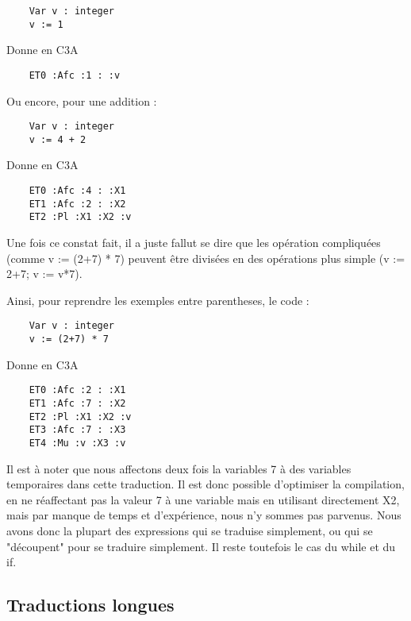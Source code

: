 \documentclass{article}
\begin{document}
\begin{lstlisting}
    Var v : integer
    v := 1
\end{lstlisting}

Donne en C3A

\begin{lstlisting}
    ET0 :Afc :1 : :v
\end{lstlisting}

Ou encore, pour une addition :

\begin{lstlisting}
    Var v : integer
    v := 4 + 2
\end{lstlisting}

Donne en C3A

\begin{lstlisting}
    ET0 :Afc :4 : :X1
    ET1 :Afc :2 : :X2
    ET2 :Pl :X1 :X2 :v
\end{lstlisting}

\bigbreak

Une fois ce constat fait, il a juste fallut se dire que les opération compliquées (comme v := (2+7) * 7) peuvent être divisées en des opérations plus simple (v := 2+7; v := v*7).

Ainsi, pour reprendre les exemples entre parentheses, le code :

\begin{lstlisting}
    Var v : integer
    v := (2+7) * 7
\end{lstlisting}

Donne en C3A

\begin{lstlisting}
    ET0 :Afc :2 : :X1
    ET1 :Afc :7 : :X2
    ET2 :Pl :X1 :X2 :v
    ET3 :Afc :7 : :X3
    ET4 :Mu :v :X3 :v
\end{lstlisting}

Il est à noter que nous affectons deux fois la variables 7 à des variables temporaires dans cette traduction. Il est donc possible d'optimiser la compilation, en ne réaffectant pas la valeur 7 à une variable mais en utilisant directement X2, mais par manque de temps et d'expérience, nous n'y sommes pas parvenus.
\bigbreak
Nous avons donc la plupart des expressions qui se traduise simplement, ou qui se "découpent" pour se traduire simplement. Il reste toutefois le cas du while et du if.


\subsection{Traductions longues}
\end{document}
